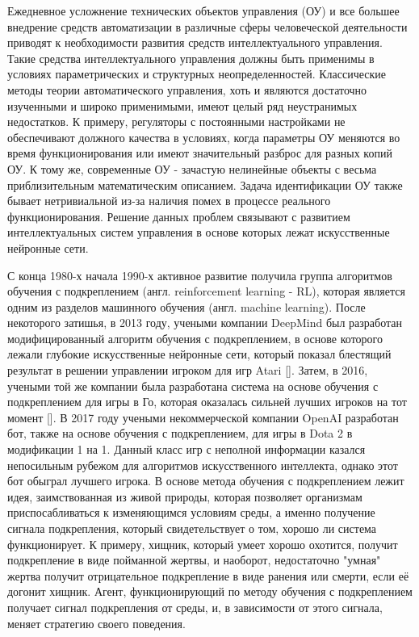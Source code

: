 
{\actuality} 
Ежедневное усложнение технических объектов управления (ОУ) и все большее внедрение средств автоматизации в различные сферы человеческой деятельности приводят к необходимости развития средств интеллектуального управления. Такие средства интеллектуального управления должны быть применимы в условиях параметрических и структурных неопределенностей. Классические методы теории автоматического управления, хоть и являются достаточно изученными и широко применимыми, имеют целый ряд неустранимых недостатков. К примеру, регуляторы с постоянными настройками не обеспечивают должного качества в условиях, когда параметры ОУ меняются во время функционирования или имеют значительный разброс для разных копий ОУ. К тому же, современные ОУ - зачастую нелинейные объекты с весьма приблизительным математическим описанием. Задача идентификации ОУ также бывает нетривиальной из-за наличия помех в процессе реального функционирования. Решение данных проблем связывают с развитием интеллектуальных систем управления в основе которых лежат искусственные нейронные сети.

С конца 1980-х начала 1990-х активное развитие получила группа алгоритмов обучения с подкреплением (англ. reinforcement learning - RL), которая является одним из разделов машинного обучения (англ. machine learning). После некоторого затишья, в 2013 году, учеными компании DeepMind был разработан модифицированный алгоритм обучения с подкреплением, в основе которого лежали глубокие искусственные нейронные сети, который показал блестящий результат в решении управлении игроком для игр Atari []. Затем, в 2016, учеными той же компании была разработана система на основе обучения с подкреплением для игры в Го, которая оказалась сильней лучших игроков на тот момент []. В 2017 году учеными некоммерческой компании OpenAI разработан бот, также на основе обучения с подкреплением, для игры в Dota 2 в модификации 1 на 1. Данный класс игр с неполной информации казался непосильным рубежом для алгоритмов искусственного интеллекта, однако этот бот обыграл лучшего игрока. В основе метода обучения с подкреплением лежит идея, заимствованная из живой природы, которая позволяет организмам приспосабливаться к изменяющимся условиям среды, а именно получение сигнала подкрепления, который свидетельствует о том, хорошо ли система функционирует. К примеру, хищник, который умеет хорошо охотится, получит подкрепление в виде пойманной жертвы, и наоборот, недостаточно "умная" жертва получит отрицательное подкрепление в виде ранения или смерти, если её догонит хищник. Агент, функционирующий по методу обучения с подкреплением получает сигнал подкрепления от среды, и, в зависимости от этого сигнала, меняет стратегию своего поведения.

